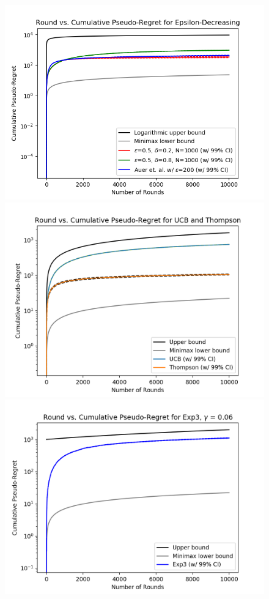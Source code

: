 \documentclass[12pt]{article}
\begin{document}
\begin{figure}[H]
\begin{minipage}[h]{0.5\linewidth}
\includegraphics[width=\linewidth, height=0.75\linewidth]{epsilon-decreasing.png}
\end{minipage}
\begin{minipage}[h]{0.5\linewidth}
\includegraphics[width=\linewidth, height=0.75\linewidth]{ucb_thompson_stochastic.png}
\end{minipage}
\begin{minipage}[h]{0.5\linewidth}
\includegraphics[width=\linewidth, height=0.75\linewidth]{exp3-2.png}

\end{minipage}
\end{figure}
\end{document}
